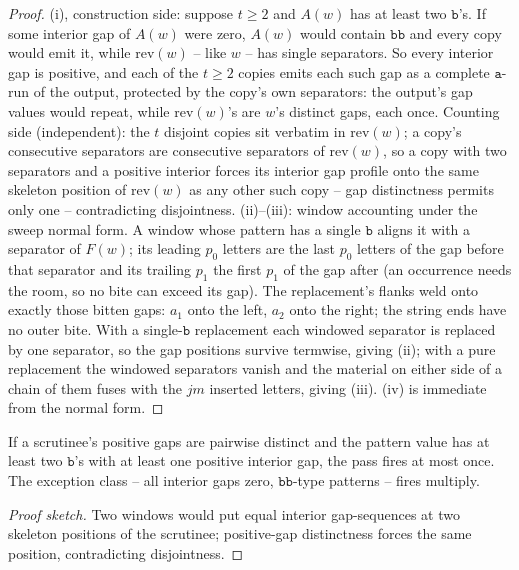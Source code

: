 \documentclass[runningheads,envcountsect]{llncs}
\begin{document}
\begin{proof}
    (i), construction side: suppose $t \ge 2$ and $A(w)$ has at least two $\mathtt b$'s. If some interior gap of $A(w)$ were zero, $A(w)$ would contain $\mathtt{bb}$ and every copy would emit it, while $\mathrm{rev}(w)$ -- like $w$ -- has single separators. So every interior gap is positive, and each of the $t \ge 2$ copies emits each such gap as a complete $\mathtt a$-run of the output, protected by the copy's own separators: the output's gap values would repeat, while $\mathrm{rev}(w)$'s are $w$'s distinct gaps, each once. Counting side (independent): the $t$ disjoint copies sit verbatim in $\mathrm{rev}(w)$; a copy's consecutive separators are consecutive separators of $\mathrm{rev}(w)$, so a copy with two separators and a positive interior forces its interior gap profile onto the same skeleton position of $\mathrm{rev}(w)$ as any other such copy -- gap distinctness permits only one -- contradicting disjointness. (ii)--(iii): window accounting under the sweep normal form. A window whose pattern has a single $\mathtt b$ aligns it with a separator of $F(w)$; its leading $p_0$ letters are the last $p_0$ letters of the gap before that separator and its trailing $p_1$ the first $p_1$ of the gap after (an occurrence needs the room, so no bite can exceed its gap). The replacement's flanks weld onto exactly those bitten gaps: $a_1$ onto the left, $a_2$ onto the right; the string ends have no outer bite. With a single-$\mathtt b$ replacement each windowed separator is replaced by one separator, so the gap positions survive termwise, giving (ii); with a pure replacement the windowed separators vanish and the material on either side of a chain of them fuses with the $jm$ inserted letters, giving (iii). (iv) is immediate from the normal form.
\end{proof}

\begin{lemma}
    \label{dich:lem:SD}
    If a scrutinee's positive gaps are pairwise distinct and the pattern value has at least two $\mathtt b$'s with at least one positive interior gap, the pass fires at most once. The exception class -- all interior gaps zero, $\mathtt{bb}$-type patterns -- fires multiply.
\end{lemma}

\begin{proof}[Proof sketch]
    Two windows would put equal interior gap-sequences at two skeleton positions of the scrutinee; positive-gap distinctness forces the same position, contradicting disjointness.
\end{proof}
\end{document}
